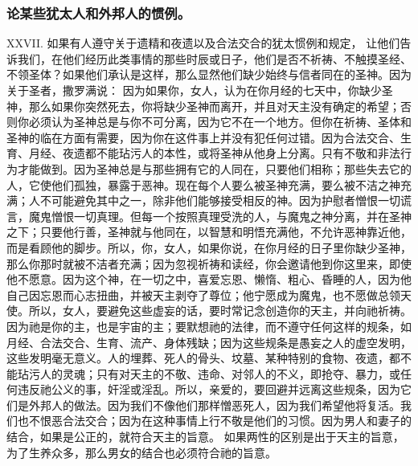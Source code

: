 
\subsubsection{论某些犹太人和外邦人的惯例。}

XXVII. 如果有人遵守关于遗精和夜遗以及合法交合的犹太惯例和规定， 让他们告诉我们，在他们经历此类事情的那些时辰或日子，他们是否不祈祷、不触摸圣经、不领圣体？如果他们承认是这样，那么显然他们缺少始终与信者同在的圣神。因为关于圣者，撒罗满说： 因为如果你，女人，认为在你月经的七天中，你缺少圣神，那么如果你突然死去，你将缺少圣神而离开，并且对天主没有确定的希望；否则你必须认为圣神总是与你不可分离，因为它不在一个地方。但你在祈祷、圣体和圣神的临在方面有需要，因为你在这件事上并没有犯任何过错。因为合法交合、生育、月经、夜遗都不能玷污人的本性，或将圣神从他身上分离。只有不敬和非法行为才能做到。因为圣神总是与那些拥有它的人同在，只要他们相称；那些失去它的人，它使他们孤独，暴露于恶神。现在每个人要么被圣神充满，要么被不洁之神充满；人不可能避免其中之一，除非他们能够接受相反的神。因为护慰者憎恨一切谎言，魔鬼憎恨一切真理。但每一个按照真理受洗的人，与魔鬼之神分离，并在圣神之下；只要他行善，圣神就与他同在，以智慧和明悟充满他，不允许恶神靠近他，而是看顾他的脚步。所以，你，女人，如果你说，在你月经的日子里你缺少圣神，那么你那时就被不洁者充满；因为忽视祈祷和读经，你会邀请他到你这里来，即使他不愿意。因为这个神，在一切之中，喜爱忘恩、懒惰、粗心、昏睡的人，因为他自己因忘恩而心志扭曲，并被天主剥夺了尊位；他宁愿成为魔鬼，也不愿做总领天使。所以，女人，要避免这些虚妄的话，要时常记念创造你的天主，并向祂祈祷。因为祂是你的主，也是宇宙的主；要默想祂的法律，而不遵守任何这样的规条，如月经、合法交合、生育、流产、身体残缺；因为这些规条是愚妄之人的虚空发明，这些发明毫无意义。人的埋葬、死人的骨头、坟墓、某种特别的食物、夜遗，都不能玷污人的灵魂；只有对天主的不敬、违命、对邻人的不义，即抢夺、暴力，或任何违反祂公义的事，奸淫或淫乱。所以，亲爱的，要回避并远离这些规条，因为它们是外邦人的做法。因为我们不像他们那样憎恶死人，因为我们希望他将复活。我们也不恨恶合法交合；因为在这种事情上行不敬是他们的习惯。因为男人和妻子的结合，如果是公正的，就符合天主的旨意。 如果两性的区别是出于天主的旨意，为了生养众多，那么男女的结合也必须符合祂的旨意。\par

